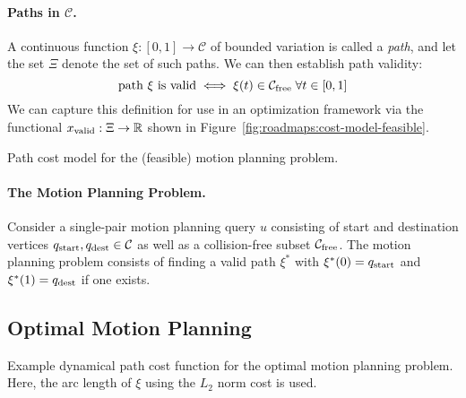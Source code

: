 \paragraph{Paths in $\mathcal{C}$.}
A continuous function $\xi : [0,1] \rightarrow \mathcal{C}$
of bounded variation is called a \emph{path},
and let the set $\Xi$ denote the set of such paths.
We can then establish path validity:
\begin{equation}
   \mbox{path $\xi$ is valid} \iff
   \xi(t) \in \mathcal{C}_{\mbox{\scriptsize free}} \;\forall t \in [0,1]
   \label{eqn:roadmaps:path-validity}
\end{equation}
We can capture this definition for use in an optimization
framework via the functional
$x_{\mbox{\scriptsize valid}} : \Xi \rightarrow \mathbb{R}$
shown in Figure~\ref{fig:roadmaps:cost-model-feasible}.

\begin{marginfigure}
   \centering
   \caption{Path cost model
      for the (feasible) motion planning problem.}
   \label{fig:roadmaps:cost-model-feasible}
\end{marginfigure}

\paragraph{The Motion Planning Problem.}
Consider a single-pair motion planning query $u$
consisting of start and destination vertices
$q_{\mbox{\scriptsize start}}, q_{\mbox{\scriptsize dest}} \in \mathcal{C}$
as well as a collision-free subset $\mathcal{C}_{\mbox{\scriptsize free}}$.
The motion planning problem consists of finding a valid path $\xi^*$
with $\xi^*(0) = q_{\mbox{\scriptsize start}}$ and $\xi^*(1) = q_{\mbox{\scriptsize dest}}$
if one exists.

\subsection{Optimal Motion Planning}

\begin{marginfigure}
   \centering
   \caption{Example dynamical path cost function for the optimal
      motion planning problem.
      Here, the arc length of $\xi$ using the $L_2$ norm cost is used.}
   \label{fig:roadmaps:cost-model-path}
\end{marginfigure}


